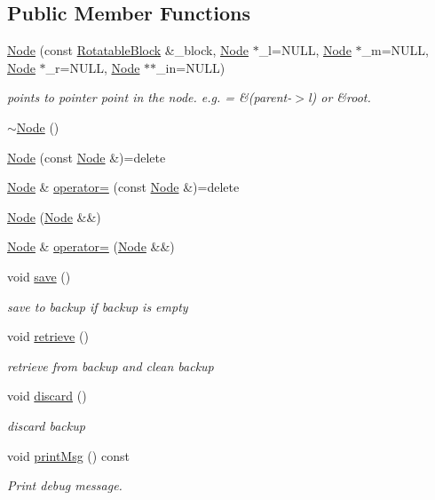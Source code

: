 \subsection*{Public Member Functions}
\begin{DoxyCompactItemize}
\item 
\hyperlink{classTTree_1_1Node_a73f229145664a7b5ce0c41746ba4e881}{Node} (const \hyperlink{structRotatableBlock}{Rotatable\+Block} \&\+\_\+block, \hyperlink{classTTree_1_1Node}{Node} $\ast$\+\_\+l=N\+U\+L\+L, \hyperlink{classTTree_1_1Node}{Node} $\ast$\+\_\+m=N\+U\+L\+L, \hyperlink{classTTree_1_1Node}{Node} $\ast$\+\_\+r=N\+U\+L\+L, \hyperlink{classTTree_1_1Node}{Node} $\ast$$\ast$\+\_\+in=N\+U\+L\+L)
\begin{DoxyCompactList}\small\item\em points to pointer point in the node. e.\+g. = \&(parent-\/$>$l) or \&root. \end{DoxyCompactList}\item 
\hyperlink{classTTree_1_1Node_a464e50288304ef7e9257a182125a474a}{$\sim$\+Node} ()
\item 
\hyperlink{classTTree_1_1Node_a6b9ce78ca08f3648379cf135d6796092}{Node} (const \hyperlink{classTTree_1_1Node}{Node} \&)=delete
\item 
\hyperlink{classTTree_1_1Node}{Node} \& \hyperlink{classTTree_1_1Node_a20ffdb80255bcabcdff42201b961869e}{operator=} (const \hyperlink{classTTree_1_1Node}{Node} \&)=delete
\item 
\hyperlink{classTTree_1_1Node_a78c5f48ae1323abc4b9186f1b7e89dd1}{Node} (\hyperlink{classTTree_1_1Node}{Node} \&\&)
\item 
\hyperlink{classTTree_1_1Node}{Node} \& \hyperlink{classTTree_1_1Node_aa3c96d0cacc8d285aee7290a257077b1}{operator=} (\hyperlink{classTTree_1_1Node}{Node} \&\&)
\item 
void \hyperlink{classTTree_1_1Node_a12a499962f965e7e226e2af0222747a3}{save} ()
\begin{DoxyCompactList}\small\item\em save to backup if backup is empty \end{DoxyCompactList}\item 
void \hyperlink{classTTree_1_1Node_a0a254a0c8103d02053475dd8c523fdc1}{retrieve} ()
\begin{DoxyCompactList}\small\item\em retrieve from backup and clean backup \end{DoxyCompactList}\item 
void \hyperlink{classTTree_1_1Node_afb1009d2a47179a4774e42ee5140af36}{discard} ()
\begin{DoxyCompactList}\small\item\em discard backup \end{DoxyCompactList}\item 
void \hyperlink{classTTree_1_1Node_a6d989c4974f820a288dcf18cad3e8ed1}{print\+Msg} () const 
\begin{DoxyCompactList}\small\item\em Print debug message. \end{DoxyCompactList}\end{DoxyCompactItemize}

